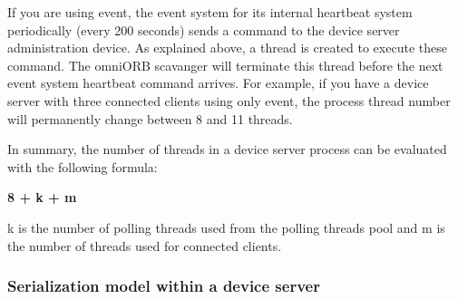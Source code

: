 If you are using event, the event system for its internal heartbeat
system periodically (every 200 seconds) sends a command to the device
server administration device. As explained above, a thread is created
to execute these command. The omniORB scavanger will terminate this
thread before the next event system heartbeat command arrives. For
example, if you have a device server with three connected clients
using only event, the process thread number will permanently change
between 8 and 11 threads.

In summary, the number of threads in a device server process can be
evaluated with the following formula:\begin{center}\textbf{8 + k
+ m}\end{center}k is the number of polling threads used from the
polling threads pool and m is the number of threads used for connected
clients.

\subsubsection{Serialization model within a device server\label{subsec:Serialization-model-within}}

